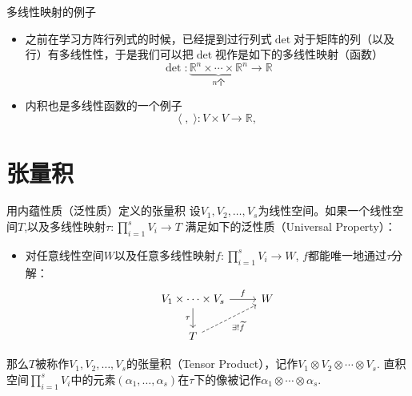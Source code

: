 
\begin{frame}

\begin{block}{多线性映射的例子}
\begin{itemize}
\item<1-> 之前在学习方阵行列式的时候，已经提到过行列式$\det$对于矩阵的列（以及行）有多线性性，于是我们可以把$\det$视作是如下的多线性映射（函数）
\[\det: \underbrace{\mathbb{R}^n \times \cdots \times \mathbb{R}^n}_{\text{$n$个}} \rightarrow \mathbb{R}\]
\item<2-> 内积也是多线性函数的一个例子
\[\langle \;,\; \rangle: V\times V \rightarrow \mathbb{R},\]
\end{itemize}
\end{block}

\end{frame}


\section{张量积}


\begin{frame}[fragile]

\begin{block}{用内蕴性质（泛性质）定义的张量积}
设$V_1,V_2,\ldots,V_s$为线性空间。如果一个线性空间$T$,以及多线性映射$\tau: \prod\limits_{i=1}^s V_i \to T$ 满足如下的泛性质（Universal Property）：
\begin{itemize}
\item 对任意线性空间$W$以及任意多线性映射$f: \prod\limits_{i=1}^s V_i \to W$, $f$都能唯一地通过$\tau$分解：
\[
\begin{tikzcd}
V_1 \times \cdots \times V_s \ar[r, "f"] \ar[d, "\tau"'] & W \\
T \ar[ur, dashrightarrow, "\exists! \widetilde{f}"'] &
\end{tikzcd}
\]
\end{itemize}
那么$T$被称作$V_1,V_2,\ldots,V_s$的张量积（Tensor Product），记作$V_1\otimes V_2\otimes \cdots \otimes V_s$. 直积空间$\prod\limits_{i=1}^s V_i$中的元素$(\alpha_1,\ldots,\alpha_s)$在$\tau$下的像被记作$\alpha_1\otimes\cdots\otimes\alpha_s.$
\end{block}

\end{frame}


